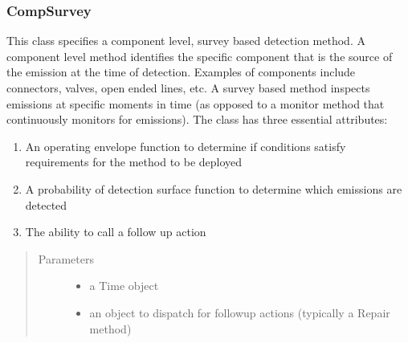 \documentclass[letterpaper,10pt,english]{sphinxmanual}
\begin{document}
\subsubsection{CompSurvey}
\label{\detokenize{index:compsurvey}}

\begin{fulllineitems}
\label{\detokenize{index:feast.DetectionModules.comp_survey.CompSurvey}}
This class specifies a component level, survey based detection method.
A component level method identifies the specific component that is the source of the
emission at the time of detection. Examples of components include connectors, valves, open ended lines, etc.
A survey based method inspects emissions at specific moments in time (as opposed to a monitor method that
continuously monitors for emissions).
The class has three essential attributes:
\begin{enumerate}
%
\item {} 
An operating envelope function to determine if conditions satisfy requirements for the method to be deployed

\item {} 
A probability of detection surface function to determine which emissions are detected

\item {} 
The ability to call a follow up action

\end{enumerate}
\begin{quote}\begin{description}
\item[{Parameters}] \leavevmode\begin{itemize}
\item {} 
 \textendash{} a Time object

\item {} 
 \textendash{} an object to dispatch for follow\sphinxhyphen{}up actions (typically a Repair method)


\end{itemize}
\end{description}
\end{quote}
\end{fulllineitems}
\end{document}
